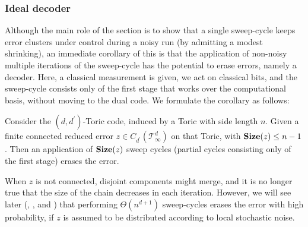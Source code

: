 \subsubsection{Ideal decoder}
 Although the main role of the section is to show that a single sweep-cycle keeps error clusters under control during a noisy run (by admitting a modest shrinking), an immediate corollary of this is that the application of non-noisy multiple iterations of the sweep-cycle has the potential to erase errors, namely a decoder. Here, a classical measurement is given, we act on classical bits, and the sweep-cycle consists only of the first stage that works over the computational basis, without moving to the dual code. We formulate the corollary as follows:
\begin{corollary}
  \label{col:idealcorrection} 
  Consider the $(d,d^{\prime})$-Toric code, induced by a Toric with side length $n$. Given a finite connected reduced error $z \in C_{d^{\prime}}(\mathcal T_\infty^d)$ on that Toric, with $\mathbf{Size}(z) \le n-1$. Then an application of $\mathbf{Size}(z)$ sweep cycles (partial cycles consisting only of the first stage) erases the error.
\end{corollary}
When $z$ is not connected, disjoint components might merge, and it is no longer true that the size of the chain decreases in each iteration. However, we will see later (, , and ) that performing $\Theta(n^{d+1})$ sweep-cycles erases the error with high probability, if $z$ is assumed to be distributed according to local stochastic noise.




